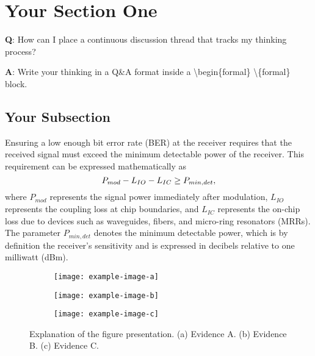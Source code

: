 \documentclass[../template.tex]{subfiles}
\begin{document}
\section{Your Section One}

\blindtext

\begin{formal}
	\textbf{Q}: How can I place a continuous discussion thread that tracks my thinking process?
	
	\noindent\textbf{A}: Write your thinking in a Q\&A format inside a \textbackslash begin\{formal\} \textbackslash\{formal\} block. 
\end{formal}

\subsection{Your Subsection}

Ensuring a low enough bit error rate (BER) at the receiver requires that the received signal must exceed the minimum detectable power of the receiver. This requirement can be expressed mathematically as
\begin{equation}
	P_{mod}-L_{IO}-L_{IC} \geq P_{min,det}, \tagaddtext{[dBm]}
	\label{eqn:opticalPowerBudget}
\end{equation}
where $P_{mod}$ represents the signal power immediately after modulation, $L_{IO}$ represents the coupling loss at chip boundaries, and $L_{IC}$ represents the on-chip loss due to devices such as waveguides, fibers, and micro-ring resonators (MRRs). The parameter $P_{min,det}$ denotes the minimum detectable power, which is by definition the receiver's sensitivity and is expressed in decibels relative to one milliwatt (dBm).

\begin{figure}[!hbt]
	\centering
	\begin{subfigure}[b]{0.38\textwidth}
		\texttt{[image: example-image-a]}
		\caption{}
		\label{fig:exampleImageA}		%
		\texttt{[image: example-image-b]}
		\caption{}
		\label{fig:exampleImageB}		%
	\end{subfigure}
	\begin{subfigure}[b]{0.6\textwidth}
		\centering
		\texttt{[image: example-image-c]}
		\caption{}
		\label{fig:exampleImageC}		%
	\end{subfigure}
	\caption{Explanation of the figure presentation. (a) Evidence A. (b) Evidence B. (c) Evidence C.}
	\label{fig:exampleImages}		%
\end{figure}
\end{document}
